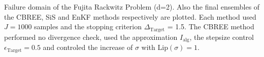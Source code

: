 Failure domain of the Fujita Rackwitz Problem (d=2). Also the final ensembles of the CBREE, SiS and EnKF methods respectively are plotted. Each method used $J=1000$ samples and the stopping criterion $\Delta_{\text{Target}}$ = 1.5. The CBREE method performed no divergence check, used the approximation $I_\text{alg}$, the stepsize control $\epsilon_{\text{Target}}=0.5$ and controled the increase of $\sigma$ with $\text{Lip}(\sigma) = 1$.